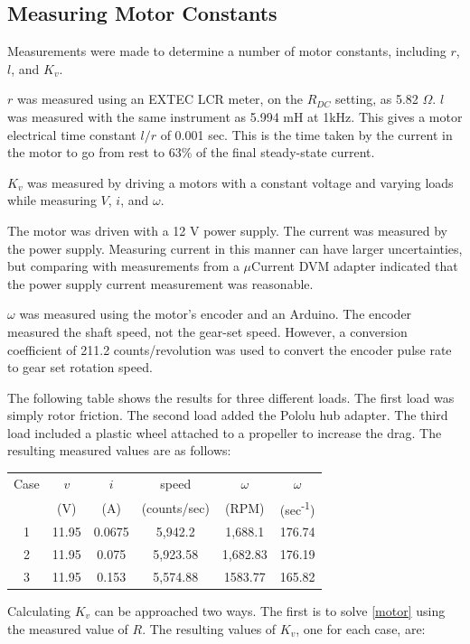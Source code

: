\documentclass[12pt,letterpaper]{article}
\begin{document}
\begin{appendices}
\section{Measuring Motor Constants}
\label{appendix:measure}
Measurements were made to determine a number of motor constants, including $r$, $l$, and $K_{v}$.  

$r$ was measured using an EXTEC LCR meter, on the $R_{DC}$ setting, as 5.82 $\Omega$. $l$ was 
measured with the same instrument as 5.994 mH at 1kHz.  This gives a motor electrical time constant $l/r$ of 0.001 sec.  This is the time taken by the current in the motor to go from rest to 63\% of the final steady-state current.

$K_{v}$ was measured by driving a motors with a constant voltage and
varying loads while measuring $V$, $i$, and $\omega$.  


The motor was driven with a 12 V power supply.  The current was measured by the power supply.  Measuring current in this manner can have larger uncertainties, but comparing with measurements from a $\mu$Current DVM adapter indicated that the power supply current measurement was reasonable.  


$\omega$ was measured using the motor's encoder and an Arduino.  The encoder measured the shaft speed, not the gear-set speed.  However, a conversion coefficient of 211.2 counts/revolution was used to convert the encoder pulse rate to gear set rotation speed.

The following table shows the results for three different loads.  The first load was simply rotor friction.  The second load added the Pololu hub adapter.  The third load included a plastic wheel attached to a propeller to increase the drag.
The resulting measured values are as follows: \\

\begin{tabular}{|c|c|c|c|c|c|}
\hline
Case & $v$ & $i$ & speed & $\omega$ & $\omega$ \\
      & (V) &  (A) & (counts/sec) & (RPM) & (sec\textsuperscript{-1}) \\
\hline
1    & 11.95 & 0.0675 & 5,942.2   & 1,688.1   & 176.74 \\
2    & 11.95 & 0.075   & 5,923.58 & 1,682.83 & 176.19 \\ 
3    & 11.95 & 0.153   & 5,574.88 & 1583.77  & 165.82 \\
\hline
\end{tabular}

Calculating $K_{v}$ can be approached two ways.  The first is to solve \eqref{motor} using the measured
value of $R$.  The resulting values of $K_{v}$, one for each case, are:


\end{appendices}
\end{document}
